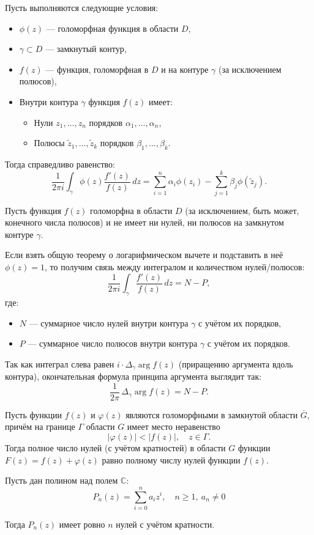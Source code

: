 \begin{theorem}
Пусть выполняются следующие условия:
\begin{itemize}
    \item $\phi(z)$ --- голоморфная функция в области $D$,
    \item $\gamma \subset D$ --- замкнутый контур,
    \item $f(z)$ --- функция, голоморфная в $D$ и на контуре $\gamma$ (за исключением полюсов),
    \item Внутри контура $\gamma$ функция $f(z)$ имеет:
    \begin{itemize}
        \item Нули $z_1, \ldots, z_n$ порядков $\alpha_1, \ldots, \alpha_n$,
        \item Полюсы $\tilde{z}_1, \ldots, \tilde{z}_k$ порядков $\beta_1, \ldots, \beta_k$.
    \end{itemize}
\end{itemize}
Тогда справедливо равенство:
\[
\frac{1}{2\pi i} \int_{\gamma} \phi(z) \frac{f'(z)}{f(z)} \, dz = \sum_{i=1}^{n} \alpha_i \phi(z_i) - \sum_{j=1}^{k} \beta_j \phi(\tilde{z}_j).
\]
\end{theorem}

\begin{theorem}
Пусть функция $f(z)$ голоморфна в области $D$ (за исключением, быть может, конечного числа полюсов) и не имеет ни нулей, ни полюсов на замкнутом контуре $\gamma$.

Если взять общую теорему о логарифмическом вычете и подставить в неё $\phi(z) = 1$, то получим связь между интегралом и количеством нулей/полюсов:
\[
\frac{1}{2\pi i} \int_{\gamma} \frac{f'(z)}{f(z)} \, dz = N - P,
\]
где:
\begin{itemize}
    \item $N$ --- суммарное число нулей внутри контура $\gamma$ с учётом их порядков,
    \item $P$ --- суммарное число полюсов внутри контура $\gamma$ с учётом их порядков.
\end{itemize}

Так как интеграл слева равен $i \cdot \Delta_\gamma \arg f(z)$ (приращению аргумента вдоль контура), окончательная формула принципа аргумента выглядит так:
\[
\frac{1}{2\pi} \, \Delta_\gamma \arg f(z) = N - P.
\]
\end{theorem}

\begin{theorem}
Пусть функции $f(z)$ и $\varphi(z)$ являются голоморфными в замкнутой области $\overline{G}$, причём на границе $\Gamma$ области $G$ имеет место неравенство
\[
|\varphi(z)| < |f(z)|, \quad z \in \Gamma.
\]
Тогда полное число нулей (с учётом кратностей) в области $G$ функции $F(z) = f(z) + \varphi(z)$ равно полному числу нулей функции $f(z)$.
\end{theorem}

\begin{theorem}
  Пусть дан полином над полем \( \mathbb{C} \):
  \[ P_n(z)=\sum_{i=0}^n a_iz^i,\quad n\geq 1,\ a_n\neq 0 \]
  
  Тогда \( P_n(z) \) имеет ровно \( n \) нулей с учётом кратности.
\end{theorem}